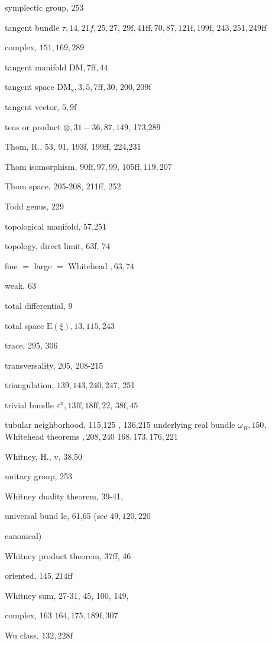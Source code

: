 \documentclass[10pt]{article}
\begin{document}
symplectic group, 253

tangent bundle $\tau, 14,21 f, 25,27$, $29 \mathrm{f}, 41 \mathrm{ff}, 70,87,121 \mathrm{f}, 199 \mathrm{f}$, $243,251,249 \mathrm{ff}$

complex, $151,169,289$

tangent manifold $\mathrm{DM}, 7 \mathrm{ff}, 44$

tangent space $\mathrm{DM}_{\mathrm{x}}, 3,5,7 \mathrm{ff}, 30$, $200,209 \mathrm{f}$

tangent vector, $5,9 \mathrm{f}$

tens or product $\otimes, 31-36,87,149$, 173,289

Thom, R., 53, 91, 193f, 199ff, 224,231

Thom isomorphism, $90 \mathrm{ff}, 97,99$, $105 \mathrm{ff}, 119,207$

Thom space, 205-208, 211ff, 252

Todd genus, 229

topological manifold, 57,251

topology, direct limit, 63f, 74

fine $=$ large $=$ Whitehead $, 63,74$

weak, 63

total differential, 9

total space $\mathrm{E}(\xi), 13,115,243$

trace, 295, 306

transversality, 205, 208-215

triangulation, $139,143,240,247$, 251

trivial bundle $\varepsilon^{\mathrm{n}}, 13 \mathrm{ff}, 18 \mathrm{ff}, 22$, $38 \mathrm{f}, 45$

tubular neighborhood, 115,125 , 136,215 underlying real bundle $\omega_{R}, 150, \quad$ Whitehead theorems $, 208,240$ $168,173,176,221$

Whitney, H., v, 38,50

unitary group, 253

Whitney duality theorem, 39-41,

universal bund le, 61,65 (see $49,120,220$

canonical)

Whitney product theorem, 37ff, 46

oriented, $145,214 \mathrm{ff}$

Whitney sum, 27-31, 45, 100, 149,

complex, 163 $164,175,189 \mathrm{f}, 307$

Wu class, $132,228 \mathrm{f}$
\end{document}
